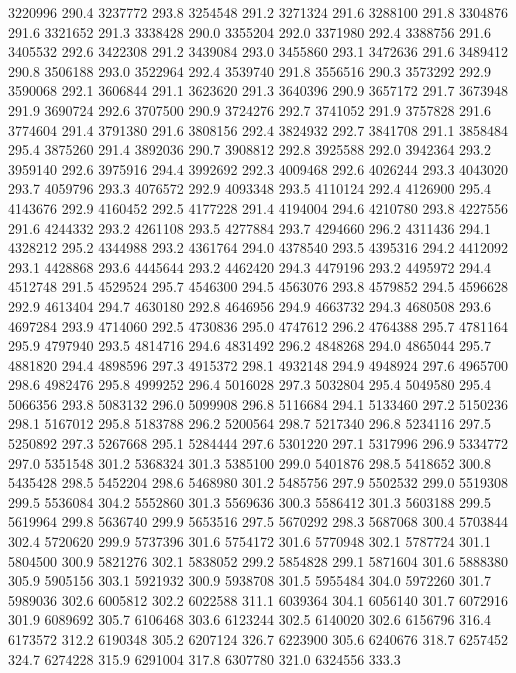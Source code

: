 3220996 290.4
3237772 293.8
3254548 291.2
3271324 291.6
3288100 291.8
3304876 291.6
3321652 291.3
3338428 290.0
3355204 292.0
3371980 292.4
3388756 291.6
3405532 292.6
3422308 291.2
3439084 293.0
3455860 293.1
3472636 291.6
3489412 290.8
3506188 293.0
3522964 292.4
3539740 291.8
3556516 290.3
3573292 292.9
3590068 292.1
3606844 291.1
3623620 291.3
3640396 290.9
3657172 291.7
3673948 291.9
3690724 292.6
3707500 290.9
3724276 292.7
3741052 291.9
3757828 291.6
3774604 291.4
3791380 291.6
3808156 292.4
3824932 292.7
3841708 291.1
3858484 295.4
3875260 291.4
3892036 290.7
3908812 292.8
3925588 292.0
3942364 293.2
3959140 292.6
3975916 294.4
3992692 292.3
4009468 292.6
4026244 293.3
4043020 293.7
4059796 293.3
4076572 292.9
4093348 293.5
4110124 292.4
4126900 295.4
4143676 292.9
4160452 292.5
4177228 291.4
4194004 294.6
4210780 293.8
4227556 291.6
4244332 293.2
4261108 293.5
4277884 293.7
4294660 296.2
4311436 294.1
4328212 295.2
4344988 293.2
4361764 294.0
4378540 293.5
4395316 294.2
4412092 293.1
4428868 293.6
4445644 293.2
4462420 294.3
4479196 293.2
4495972 294.4
4512748 291.5
4529524 295.7
4546300 294.5
4563076 293.8
4579852 294.5
4596628 292.9
4613404 294.7
4630180 292.8
4646956 294.9
4663732 294.3
4680508 293.6
4697284 293.9
4714060 292.5
4730836 295.0
4747612 296.2
4764388 295.7
4781164 295.9
4797940 293.5
4814716 294.6
4831492 296.2
4848268 294.0
4865044 295.7
4881820 294.4
4898596 297.3
4915372 298.1
4932148 294.9
4948924 297.6
4965700 298.6
4982476 295.8
4999252 296.4
5016028 297.3
5032804 295.4
5049580 295.4
5066356 293.8
5083132 296.0
5099908 296.8
5116684 294.1
5133460 297.2
5150236 298.1
5167012 295.8
5183788 296.2
5200564 298.7
5217340 296.8
5234116 297.5
5250892 297.3
5267668 295.1
5284444 297.6
5301220 297.1
5317996 296.9
5334772 297.0
5351548 301.2
5368324 301.3
5385100 299.0
5401876 298.5
5418652 300.8
5435428 298.5
5452204 298.6
5468980 301.2
5485756 297.9
5502532 299.0
5519308 299.5
5536084 304.2
5552860 301.3
5569636 300.3
5586412 301.3
5603188 299.5
5619964 299.8
5636740 299.9
5653516 297.5
5670292 298.3
5687068 300.4
5703844 302.4
5720620 299.9
5737396 301.6
5754172 301.6
5770948 302.1
5787724 301.1
5804500 300.9
5821276 302.1
5838052 299.2
5854828 299.1
5871604 301.6
5888380 305.9
5905156 303.1
5921932 300.9
5938708 301.5
5955484 304.0
5972260 301.7
5989036 302.6
6005812 302.2
6022588 311.1
6039364 304.1
6056140 301.7
6072916 301.9
6089692 305.7
6106468 303.6
6123244 302.5
6140020 302.6
6156796 316.4
6173572 312.2
6190348 305.2
6207124 326.7
6223900 305.6
6240676 318.7
6257452 324.7
6274228 315.9
6291004 317.8
6307780 321.0
6324556 333.3
